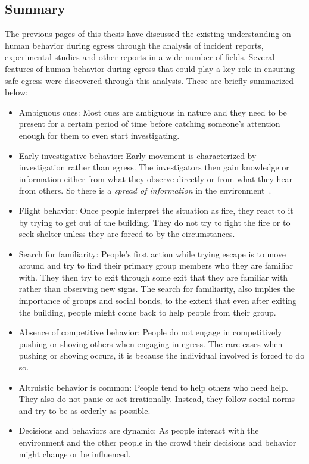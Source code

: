 \subsection{Summary}
\label{LiteratureReview:PsychSummary}

The previous pages of this thesis have discussed the existing understanding on human behavior during egress through the analysis of incident reports, experimental studies and other reports in a wide number of fields. Several features of human behavior during egress that could play a key role in ensuring safe egress were discovered through this analysis. These are briefly summarized below:
\begin{itemize}
\item Ambiguous cues: Most cues are ambiguous in nature and they need to be present for a certain period of time before catching someone's attention enough for them to even start investigating.
\item Early investigative behavior: Early movement is characterized by investigation rather than egress. The investigators then gain knowledge or information either from what they observe directly or from what they hear from others. So there is a \emph{spread of information} in the environment~\cite{Fahy:2010to,Purser:2001ts}.
\item Flight behavior: Once people interpret the situation as fire, they react to it by trying to get out of the building. They do not try to fight the fire or to seek shelter unless they are forced to by the circumstances.
\item Search for familiarity: People's first action while trying escape is to move around and try to find their primary group members who they are familiar with. They then try to exit through some exit that they are familiar with rather than observing new signs. The search for familiarity, also implies the importance of groups and social bonds, to the extent that even after exiting the building, people might come back to help people from their group.
\item Absence of competitive behavior: People do not engage in competitively pushing or shoving others when engaging in egress. The rare cases when pushing or shoving occurs, it is because the individual involved is forced to do so.
\item Altruistic behavior is common: People tend to help others who need help. They also do not panic or act irrationally. Instead, they follow social norms and try to be as orderly as possible.
\item Decisions and behaviors are dynamic: As people interact with the environment and the other people in the crowd their decisions and behavior might change or be influenced.

\end{itemize}
